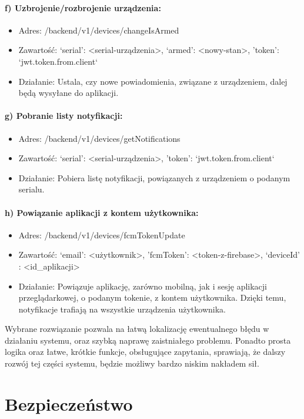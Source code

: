 \paragraph{f) Uzbrojenie/rozbrojenie urządzenia:}
\begin{itemize}
\item Adres: /backend/v1/devices/changeIsArmed
\item Zawartość: {‘serial’: <serial-urządzenia>, ‘armed’: <nowy-stan>, 
'token': `jwt.token.from.client`}
\item Działanie: Ustala, czy nowe powiadomienia, związane z urządzeniem, dalej będą wysyłane do aplikacji.
\end{itemize}
\paragraph{g) Pobranie listy notyfikacji:}
\begin{itemize}
\item Adres: /backend/v1/devices/getNotifications
\item Zawartość: {‘serial’: <serial-urządzenia>,  'token': `jwt.token.from.client`}
\item Działanie: Pobiera listę notyfikacji, powiązanych z urządzeniem o podanym serialu.
\end{itemize}
\paragraph{h) Powiązanie aplikacji z kontem użytkownika:}
\begin{itemize}
\item Adres: /backend/v1/devices/fcmTokenUpdate
\item Zawartość: {‘email’: <użytkownik>, 'fcmToken': <token-z-firebase>, 
‘deviceId’ : <id_aplikacji>}
\item Działanie: Powiązuje aplikację, zarówno mobilną, jak i sesję aplikacji przeglądarkowej, o podanym tokenie, z kontem użytkownika. Dzięki temu, notyfikacje trafiają na wszystkie urządzenia użytkownika.
\end{itemize}

Wybrane rozwiązanie pozwala na łatwą lokalizację ewentualnego błędu w działaniu systemu, oraz szybką naprawę zaistniałego problemu. Ponadto prosta logika oraz łatwe, krótkie funkcje, obsługujące zapytania, sprawiają, że dalszy rozwój tej części systemu, będzie możliwy bardzo niskim nakładem sił. 

\section*{Bezpieczeństwo}

